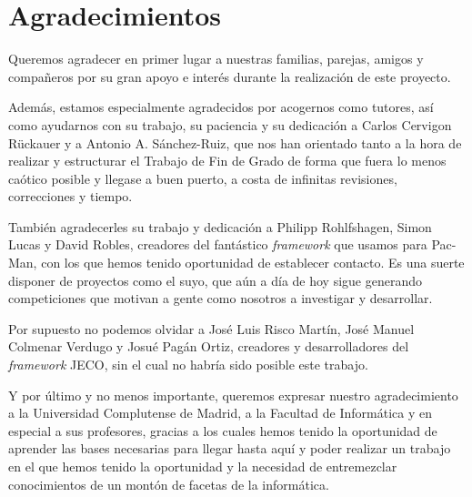 \chapter{Agradecimientos} \label{cap:agradecimientos}
Queremos agradecer en primer lugar a nuestras familias, parejas, amigos y compañeros por su gran apoyo e interés durante la realización de este proyecto.

Además, estamos especialmente agradecidos por acogernos como tutores, así como ayudarnos con su trabajo, su paciencia y su dedicación a Carlos Cervigon Rückauer y a Antonio A. Sánchez-Ruiz, que nos han orientado tanto a la hora de realizar y estructurar el Trabajo de Fin de Grado de forma que fuera lo menos caótico posible y llegase a buen puerto, a costa de infinitas revisiones, correcciones y tiempo.
 
También agradecerles su trabajo y dedicación a Philipp Rohlfshagen, Simon Lucas y David Robles, creadores del fantástico \textit{framework} que usamos para Pac-Man, con los que hemos tenido oportunidad de establecer contacto. Es una suerte disponer de proyectos como el suyo, que aún a día de hoy sigue generando competiciones que motivan a gente como nosotros a investigar y desarrollar.
 
Por supuesto no podemos olvidar a José Luis Risco Martín, José Manuel Colmenar Verdugo y Josué Pagán Ortiz, creadores y desarrolladores del \textit{framework}  JECO, sin el cual no habría sido posible este trabajo.
 
Y por último y no menos importante, queremos expresar nuestro agradecimiento a la Universidad Complutense de Madrid, a la Facultad de Informática y en especial a sus profesores, gracias a los cuales hemos tenido la oportunidad de aprender las bases necesarias para llegar hasta aquí y poder realizar un trabajo en el que hemos tenido la oportunidad y la necesidad de entremezclar conocimientos de un montón de facetas de la informática.
